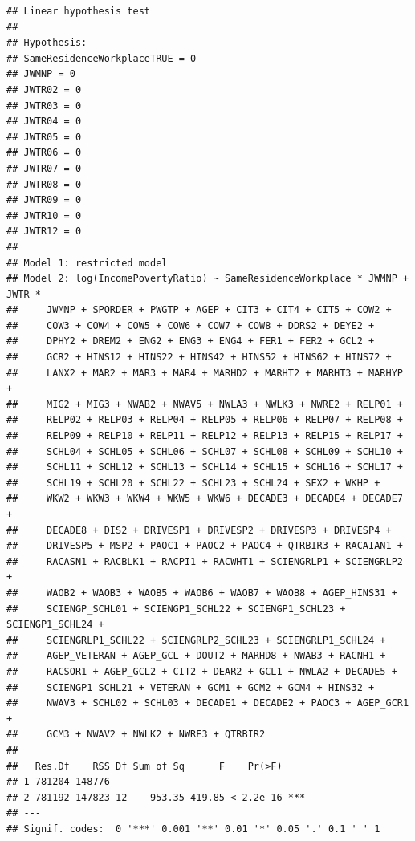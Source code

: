 \documentclass[
]{article}
\begin{document}
\begin{verbatim}
## Linear hypothesis test
## 
## Hypothesis:
## SameResidenceWorkplaceTRUE = 0
## JWMNP = 0
## JWTR02 = 0
## JWTR03 = 0
## JWTR04 = 0
## JWTR05 = 0
## JWTR06 = 0
## JWTR07 = 0
## JWTR08 = 0
## JWTR09 = 0
## JWTR10 = 0
## JWTR12 = 0
## 
## Model 1: restricted model
## Model 2: log(IncomePovertyRatio) ~ SameResidenceWorkplace * JWMNP + JWTR * 
##     JWMNP + SPORDER + PWGTP + AGEP + CIT3 + CIT4 + CIT5 + COW2 + 
##     COW3 + COW4 + COW5 + COW6 + COW7 + COW8 + DDRS2 + DEYE2 + 
##     DPHY2 + DREM2 + ENG2 + ENG3 + ENG4 + FER1 + FER2 + GCL2 + 
##     GCR2 + HINS12 + HINS22 + HINS42 + HINS52 + HINS62 + HINS72 + 
##     LANX2 + MAR2 + MAR3 + MAR4 + MARHD2 + MARHT2 + MARHT3 + MARHYP + 
##     MIG2 + MIG3 + NWAB2 + NWAV5 + NWLA3 + NWLK3 + NWRE2 + RELP01 + 
##     RELP02 + RELP03 + RELP04 + RELP05 + RELP06 + RELP07 + RELP08 + 
##     RELP09 + RELP10 + RELP11 + RELP12 + RELP13 + RELP15 + RELP17 + 
##     SCHL04 + SCHL05 + SCHL06 + SCHL07 + SCHL08 + SCHL09 + SCHL10 + 
##     SCHL11 + SCHL12 + SCHL13 + SCHL14 + SCHL15 + SCHL16 + SCHL17 + 
##     SCHL19 + SCHL20 + SCHL22 + SCHL23 + SCHL24 + SEX2 + WKHP + 
##     WKW2 + WKW3 + WKW4 + WKW5 + WKW6 + DECADE3 + DECADE4 + DECADE7 + 
##     DECADE8 + DIS2 + DRIVESP1 + DRIVESP2 + DRIVESP3 + DRIVESP4 + 
##     DRIVESP5 + MSP2 + PAOC1 + PAOC2 + PAOC4 + QTRBIR3 + RACAIAN1 + 
##     RACASN1 + RACBLK1 + RACPI1 + RACWHT1 + SCIENGRLP1 + SCIENGRLP2 + 
##     WAOB2 + WAOB3 + WAOB5 + WAOB6 + WAOB7 + WAOB8 + AGEP_HINS31 + 
##     SCIENGP_SCHL01 + SCIENGP1_SCHL22 + SCIENGP1_SCHL23 + SCIENGP1_SCHL24 + 
##     SCIENGRLP1_SCHL22 + SCIENGRLP2_SCHL23 + SCIENGRLP1_SCHL24 + 
##     AGEP_VETERAN + AGEP_GCL + DOUT2 + MARHD8 + NWAB3 + RACNH1 + 
##     RACSOR1 + AGEP_GCL2 + CIT2 + DEAR2 + GCL1 + NWLA2 + DECADE5 + 
##     SCIENGP1_SCHL21 + VETERAN + GCM1 + GCM2 + GCM4 + HINS32 + 
##     NWAV3 + SCHL02 + SCHL03 + DECADE1 + DECADE2 + PAOC3 + AGEP_GCR1 + 
##     GCM3 + NWAV2 + NWLK2 + NWRE3 + QTRBIR2
## 
##   Res.Df    RSS Df Sum of Sq      F    Pr(>F)    
## 1 781204 148776                                  
## 2 781192 147823 12    953.35 419.85 < 2.2e-16 ***
## ---
## Signif. codes:  0 '***' 0.001 '**' 0.01 '*' 0.05 '.' 0.1 ' ' 1
\end{verbatim}
\end{document}
